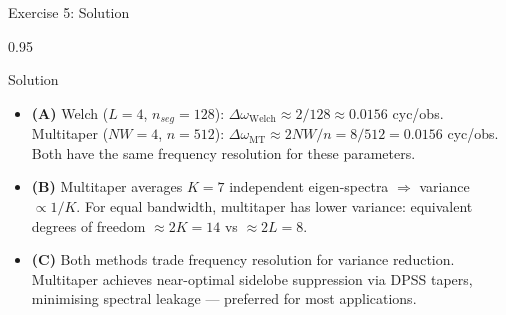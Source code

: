 \documentclass[9pt, aspectratio=169, t]{beamer}
\begin{document}
\begin{frame}{Exercise 5: Solution}
    \begin{cminipage}{0.95\textwidth}
    \begin{exampleblock}{Solution}
        {\footnotesize
        \begin{itemize}\setlength{\itemsep}{3pt}
            \item \textcolor{MainBlue}{\textbf{(A)}} Welch ($L=4$, $n_{seg}=128$): $\Delta\omega_{\text{Welch}} \approx 2/128 \approx 0.0156$ cyc/obs.
                Multitaper ($NW=4$, $n=512$): $\Delta\omega_{\text{MT}} \approx 2NW/n = 8/512 = 0.0156$ cyc/obs.
                Both have the same frequency resolution for these parameters.
            \item \textcolor{MainBlue}{\textbf{(B)}} Multitaper averages $K = 7$ independent eigen-spectra $\Rightarrow$ variance $\propto 1/K$. For equal bandwidth, multitaper has lower variance: equivalent degrees of freedom $\approx 2K = 14$ vs $\approx 2L = 8$.
            \item \textcolor{MainBlue}{\textbf{(C)}} Both methods trade frequency resolution for variance reduction. Multitaper achieves near-optimal sidelobe suppression via DPSS tapers, minimising spectral leakage --- preferred for most applications.
        \end{itemize}
        }
    \end{exampleblock}
    \end{cminipage}
\end{frame}
\end{document}
